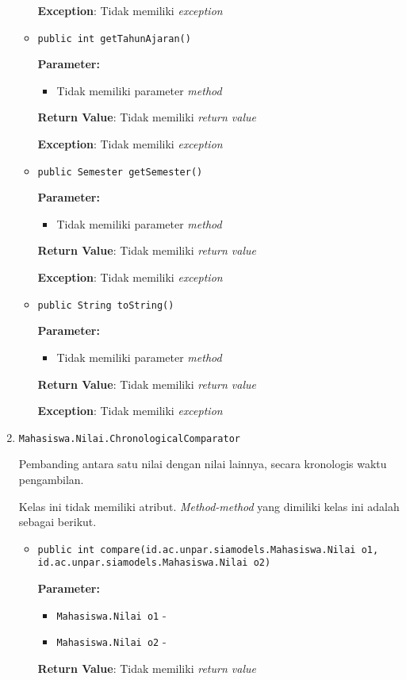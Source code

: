 \documentclass{article}
\begin{document}
\begin{enumerate}
\begin{itemize}
\textbf{Exception}: Tidak memiliki \textit{exception}

\item \texttt{public int getTahunAjaran()}

\textbf{Parameter:}
\begin{itemize}
\item Tidak memiliki parameter \textit{method}
\end{itemize}
\textbf{Return Value}: Tidak memiliki \textit{return value}

\textbf{Exception}: Tidak memiliki \textit{exception}

\item \texttt{public Semester getSemester()}

\textbf{Parameter:}
\begin{itemize}
\item Tidak memiliki parameter \textit{method}
\end{itemize}
\textbf{Return Value}: Tidak memiliki \textit{return value}

\textbf{Exception}: Tidak memiliki \textit{exception}

\item \texttt{public String toString()}

\textbf{Parameter:}
\begin{itemize}
\item Tidak memiliki parameter \textit{method}
\end{itemize}
\textbf{Return Value}: Tidak memiliki \textit{return value}

\textbf{Exception}: Tidak memiliki \textit{exception}

\end{itemize}
\item \texttt{Mahasiswa.Nilai.ChronologicalComparator}

Pembanding antara satu nilai dengan nilai lainnya, secara
 kronologis waktu pengambilan.

Kelas ini tidak memiliki atribut. \textit{Method-method} yang dimiliki kelas ini adalah sebagai berikut.
\begin{itemize}
\item \texttt{public int compare(id.ac.unpar.siamodels.Mahasiswa.Nilai o1, id.ac.unpar.siamodels.Mahasiswa.Nilai o2)}

\textbf{Parameter:}
\begin{itemize}
\item \texttt{Mahasiswa.Nilai o1} - 
\item \texttt{Mahasiswa.Nilai o2} - 
\end{itemize}
\textbf{Return Value}: Tidak memiliki \textit{return value}


\end{itemize}
\end{enumerate}
\end{document}
